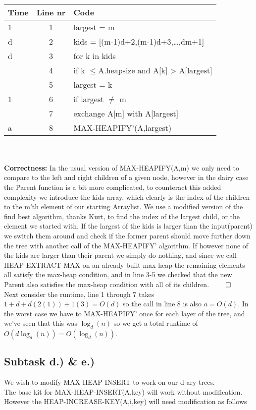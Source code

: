 \documentclass{article}
\theoremstyle{remark}
\numberwithin{equation}{section}
\begin{document}
\\\begin{tabular}{l | c | l} 
	Time & Line nr & Code \\ \hline
	1 & 1 & largest = m \\
	d & 2 & kids = [(m-1)d+2,(m-1)d+3,\dots,dm+1] \\
	d & 3 & for k in kids \\
	\indent 2 & 4 & \indent if k $\leq $A.heapsize and A[k] > A[largest] \\
	\indent\indent 1 & 5 & \indent\indent largest = k \\
	1 & 6 & if largest $\neq$ m \\
	\indent3 & 7 & \indent exchange A[m] with A[largest] \\
	a & 8 & \indent MAX-HEAPIFY'(A,largest)
\end{tabular}\\\\
\textbf{Correctness:} In the usual version of MAX-HEAPIFY(A,m) we only need to compare to the left and right children of a given node, however in the dairy case the Parent function is a bit more complicated, to counteract this added complexity we introduce the kids array, which clearly is the index of the children to the m'th element of our starting Arraylist. We use a modified version of the find best algorithm, thanks Kurt, to find the index of the largest child, or the element we started with. If the largest of the kids is larger than the input(parent) we switch them around and check if the former parent should move further down the tree with another call of the MAX-HEAPIFY' algorithm. If however none of the kids are larger than their parent we simply do nothing, and since we call HEAP-EXTRACT-MAX on an already built max-heap the remaining elements all satisfy the max-heap condition, and in line 3-5 we checked that the new Parent also satisfies the max-heap condition with all of its children. $\qed$
\\Next consider the runtime, line 1 through 7 takes $1+d+d(2(1))+1(3)= O(d)$ so the call in line 8 is also $a = O(d)$. In the worst case we have to MAX-HEAPIFY' once for each layer of the tree, and we've seen that this was $\log_d(n)$ so we get a total runtime of $O(d\log_d(n)) = O(\log_d(n))$.
\newpage\subsection{Subtask d.) \& e.)} We wish to modify MAX-HEAP-INSERT to work on our d-ary trees.
\\The base kit for MAX-HEAP-INSERT(A,key) will work without modification. However the HEAP-INCREASE-KEY(A,i,key) will need modification as follows
\end{document}
